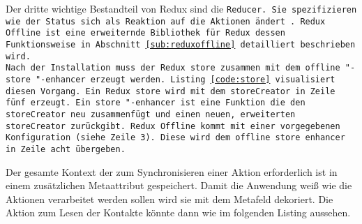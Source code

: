 Der dritte wichtige Bestandteil von Redux sind die \tt{Reducer}. Sie spezifizieren wie der Status sich als Reaktion auf die Aktionen ändert~\cite{redux}.
% 
Redux Offline ist eine erweiternde Bibliothek für Redux dessen Funktionsweise in Abschnitt \ref{sub:reduxoffline} detailliert beschrieben wird.\\
Nach der Installation muss der Redux \tt{store} zusammen mit dem \tt{offline "-store "-enhancer} erzeugt werden. Listing \ref{code:store} visualisiert diesen Vorgang. Ein Redux \tt{store} wird mit dem \tt{storeCreator} in Zeile fünf erzeugt. Ein \tt{store "-enhancer} ist eine Funktion die den \tt{storeCreator} neu zusammenfügt und einen neuen, erweiterten \tt{storeCreator} zurückgibt.
Redux Offline kommt mit einer vorgegebenen Konfiguration (siehe Zeile 3). Diese wird dem \tt{offline store enhancer} in Zeile acht übergeben.
\begin{center}
  
\end{center}
Der gesamte Kontext der zum Synchronisieren einer Aktion erforderlich ist in einem zusätzlichen Metaattribut gespeichert. Damit die Anwendung weiß wie die Aktionen verarbeitet werden sollen wird sie mit dem Metafeld dekoriert. Die Aktion zum Lesen der Kontakte könnte dann wie im folgenden Listing aussehen.
\begin{center}
  
\end{center}
